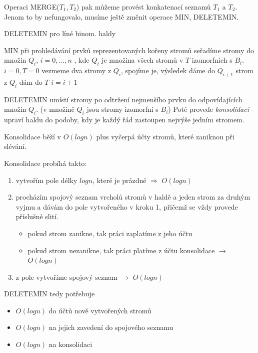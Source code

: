 Operaci MERGE($T_1, T_2$) pak můžeme provést konkatenací seznamů $T_1$ a $T_2$.
Jenom to by nefungovalo, musíme ještě změnit operace MIN, DELETEMIN.

\begin{algorithm}[!htb]
\caption{DELETEMIN pro líné binom. haldy}
\label{alg:heaps.binom-line.min}
\begin{algorithmic}
\STATE MIN
\STATE při prohledávání prvků reprezentovaných kořeny stromů seřadíme
stromy do množin $Q_i$, $i=0,...,n$ , kde $Q_i$ je množina všech stromů v
$T$ izomorfních s $B_i$.
\STATE $i = 0, T = 0$
    \STATE vezmeme dva stromy z $Q_i$, spojíme je, výsledek dáme do $Q_{i+1}$
  \ENDWHILE
    \STATE strom z $Q_i$ dám do $T$
  \ENDIF
  \STATE $i = i + 1$
\ENDWHILE
\end{algorithmic}
\end{algorithm}

DELETEMIN umístí stromy po odtržení nejmenšího prvku do odpovídajících 
množin $Q_i$. (v množině $Q_i$ jsou stromy izomorfní s $B_i$)
Poté provede \emph{konsolidaci} - upraví haldu do podoby, kdy je každý řád
zastoupen nejvýše jedním stromem. 

Konsolidace běží v $O(log n)$ plus vyčerpá účty stromů, které zaniknou při
slévání.

\begin{samepage}
Konsolidace probíhá takto:
\begin{enumerate}
  \item vytvořím pole délky $log n$, které je prázdné 
  	$\Rightarrow$ $O(log n)$
  \item procházím spojový seznam vrcholů stromů v haldě 
  	a jeden strom za druhým vyjmu a 
  	dávám do pole vytvořeného v kroku 1, přičemž se vždy provede 
	příslušné slití.
	\begin{itemize}
	  \item pokud strom zanikne, tak práci zaplatíme z jeho účtu
	  \item pokud strom nezanikne, tak práci platíme z účtu
	  konsolidace $\rightarrow$ $O(log n)$
	\end{itemize}
  \item z pole vytvoříme spojový seznam $\rightarrow$ $O(log n)$
\end{enumerate}
\end{samepage}

\begin{samepage}
DELETEMIN tedy potřebuje
\begin{itemize}
  \item $O(log n)$ do účtů nově vytvořených stromů
  \item $O(log n)$ na jejich zavedení do spojového seznamu
  \item $O(log n)$ na konsolidaci
\end{itemize}
\end{samepage}

